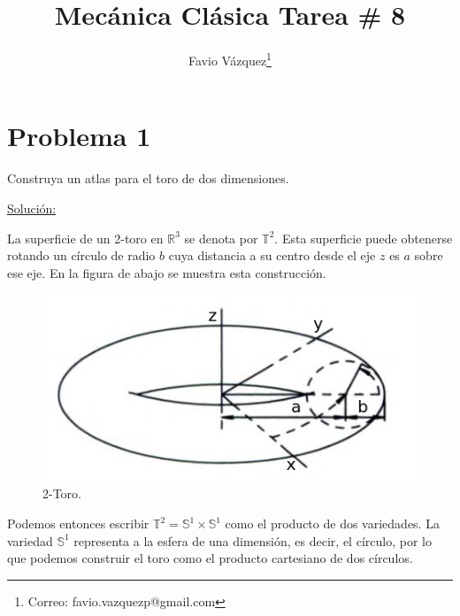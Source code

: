 \documentclass[a4paper,10pt]{article}
\title{Mecánica Clásica Tarea \# 8}
\author{Favio Vázquez\thanks{Correo: favio.vazquezp@gmail.com}}\affil{Instituto de Ciencias Nucleares. Universidad Nacional Autónoma de México.}
\date{}
\numberwithin{equation}{section}
\begin{document}
\makeatletter
\def\@maketitle{%
  \newpage
  \null
  \vskip 2em%
  \begin{center}%
  \let \footnote \thanks
    {\Large\bfseries \@title \par}%
    \vskip 1.5em%
    {\normalsize
      \lineskip .5em%
      \begin{tabular}[t]{c}%
        \@author
      \end{tabular}\par}%
    \vskip 1em%
    {\normalsize \@date}%
  \end{center}%
  \par
  \vskip 1.5em}
\makeatother

\maketitle

\section{Problema 1}

Construya un atlas para el toro de dos dimensiones.

\vspace{.3cm}

\underline{Solución:} \vspace{.3cm}

La superficie de un 2-toro en $\mathbb{R}^3$ se denota por $\mathbb{T}^2$. Esta superficie 
puede obtenerse rotando un círculo de radio $b$ cuya distancia a su centro desde 
el eje $z$ es $a$ sobre ese eje. En la figura de abajo se muestra esta construcción.

\begin{figure}[H]
 \center 
 \includegraphics[scale=0.5]{problema1fig1}
 \caption{2-Toro.}
 \label{fig:problema1fig1}
\end{figure}

Podemos entonces escribir $\mathbb{T}^2 = \mathbb{S}^1 \times \mathbb{S}^1$ como el 
producto de dos variedades. La variedad $\mathbb{S}^1$ representa a la esfera de 
una dimensión, es decir, el círculo, por lo que podemos construir el toro como 
el producto cartesiano de dos círculos. 
\end{document}
